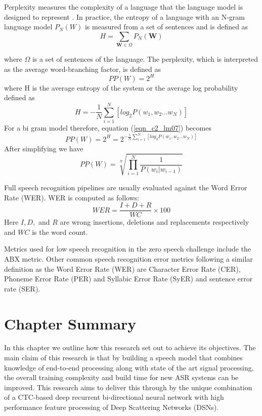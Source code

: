 Perplexity measures the complexity of a language that the language model is designed to represent \citep{1976jelinekcontinuous}. In practice, the entropy of a language with an N-gram language model $P_N(W)$ is measured from a set of sentences and is defined as
\begin{equation}H=\sum_{\mathbf{W}\in\Omega}P_N(\mathbf{W})
\label{eqn_c2_lm05}
\end{equation}

where $\Omega$ is a set of sentences of the language. The perplexity, which is interpreted as the average word-branching factor, is defined as
\begin{equation}PP(W)=2^H
\label{eqn_c2_lm06}
\end{equation}
where H is the average entropy of the system or the average log probability defined as
\begin{equation}
H=-\frac{1}{N}\sum_{i=1}^N[log_2P(w_1,w_2\dots w_N)]
\label{eqn_c2_lm07}
\end{equation}
For a bi gram model therefore, equation (\ref{eqn_c2_lm07}) becomes
\begin{equation}
PP(W)=2^H=2^{-\frac{1}{N}\sum_{i=1}^N[log_2P(w_1,w_2\dots w_N)]}
\label{eqn_c2_lm08}
\end{equation}
After simplifying we have
\begin{equation}
PP(W)=\sqrt[N]{\prod_{i=1}^N\frac{1}{P(w_i|w_{i-1})}}
\label{eqn_c2_lm09}
\end{equation}


Full speech recognition pipelines are usually evaluated against the Word Error Rate (WER).  WER is computed as follows:
\begin{equation}\label{eqn_2_3_wer}
WER=\frac{I+D+R}{WC}\times 100
\end{equation}
Here $I,D,$ and $R$ are wrong insertions, deletions and replacements respectively and $WC$ is the word count.

Metrics used for low speech recognition in the zero speech challenge \citep{versteegh2015zero} include the ABX metric. Other common speech recognition error metrics following a similar definition as the Word Error Rate (WER) are Character Error Rate (CER), Phoneme Error Rate (PER) and Syllabic Error Rate (SyER) and sentence error rate (SER).

\section{Chapter Summary}
In this chapter we outline how this research set out to achieve its objectives.  The main claim of this research is that by building a speech model that combines knowledge of end-to-end processing along with state of the art signal processing, the overall training complexity and build time for new ASR systems can be improved.  This research aims to deliver this through by the unique combination of a CTC-based deep recurrent bi-directional neural network with high performance feature processing of Deep Scattering Networks (DSNs).

